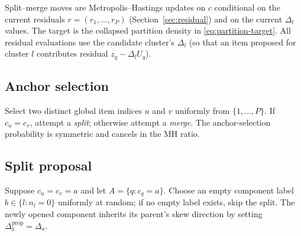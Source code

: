 \documentclass[11pt]{article}
\begin{document}
Split--merge moves are Metropolis--Hastings updates on $c$ conditional on
the current residuals $r=(r_1,\dots,r_P)$ (Section~\ref{sec:residual}) and
on the current $\Delta_l$ values.  The target is the collapsed partition
density in \eqref{eq:partition-target}.  All residual evaluations use the
candidate cluster's $\Delta_l$ (so that an item proposed for cluster $l$
contributes residual $z_q-\Delta_l U_q$).

\subsection{Anchor selection}

Select two distinct global item indices $u$ and $v$ uniformly from
$\{1,\dots,P\}$.  If $c_u=c_v$, attempt a \emph{split}; otherwise attempt
a \emph{merge}.  The anchor-selection probability is symmetric and cancels
in the MH ratio.

\subsection{Split proposal}

Suppose $c_u=c_v=a$ and let $A=\{q:c_q=a\}$.  Choose an empty component
label $b\in\{l:n_l=0\}$ uniformly at random; if no empty label exists,
skip the split.  The newly opened component inherits its parent's skew
direction by setting $\Delta_b^{\mathrm{prop}}=\Delta_a$.
\end{document}

